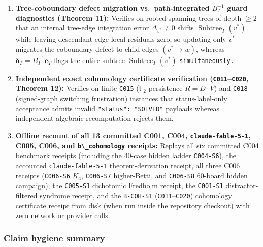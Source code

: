 \documentclass[
  11pt,
]{article}
\newcommand{\passthrough}[1]{#1}
\begin{document}
\begin{enumerate}
\item
  \textbf{Tree-coboundary defect migration vs.~path-integrated
  \(B_T^{-1}\) guard diagnostics (Theorem 11):} Verifies on rooted
  spanning trees of depth \(\ge 2\) that an internal tree-edge
  integration error \(\Delta_{v^*} \ne 0\) shifts
  \(\operatorname{Subtree}_T(v^*)\) while leaving descendant edge-local
  residuals zero, so updating only \(v^*\) migrates the coboundary
  defect to child edges \((v^* \to w)\), whereas
  \(\boldsymbol{\delta}_T = B_T^{-1}\mathbf{e}_T\) flags the entire
  subtree \(\operatorname{Subtree}_T(v^*)\) \nolinkurl{simultaneously.}
\item
  \textbf{Independent exact cohomology certificate verification
  (\passthrough{\lstinline!C011!}--\passthrough{\lstinline!C020!},
  Theorem 12):} Verifies on finite \passthrough{\lstinline!C015!}
  (\(\mathbb{F}_2\) persistence \(R = D \cdot V\)) and
  \passthrough{\lstinline!C018!} (signed-graph switching frustration)
  instances that status-label-only acceptance admits invalid
  \passthrough{\lstinline!"status": "SOLVED"!} payloads whereas
  independent algebraic recomputation rejects them.
\item
  \textbf{Offline recount of all 13 committed C001, C004,
  \nolinkurl{claude-fable-5-1}, C005, C006, and
  \passthrough{\lstinline!b\_cohomology!} receipts:} Replays all six
  committed C004 benchmark receipts (including the 40-case hidden ladder
  \passthrough{\lstinline!C004-S6!}), the accounted
  \nolinkurl{claude-fable-5-1} theorem-derivation receipt, all three
  C006 receipts (\passthrough{\lstinline!C006-S6!} \(K_4\),
  \passthrough{\lstinline!C006-S7!} higher-Betti, and
  \passthrough{\lstinline!C006-S8!} 60-board hidden campaign), the
  \passthrough{\lstinline!C005-S1!} dichotomic Fredholm receipt, the
  \passthrough{\lstinline!C001-S1!} distractor-filtered syndrome
  receipt, and the \passthrough{\lstinline!B-COH-S1!}
  (\passthrough{\lstinline!C011!}--\passthrough{\lstinline!C020!})
  cohomology certificate receipt from disk (when run inside the
  repository checkout) with zero network or provider calls.
\end{enumerate}

\subsubsection{Claim hygiene summary}\label{claim-hygiene-summary}
\end{document}
